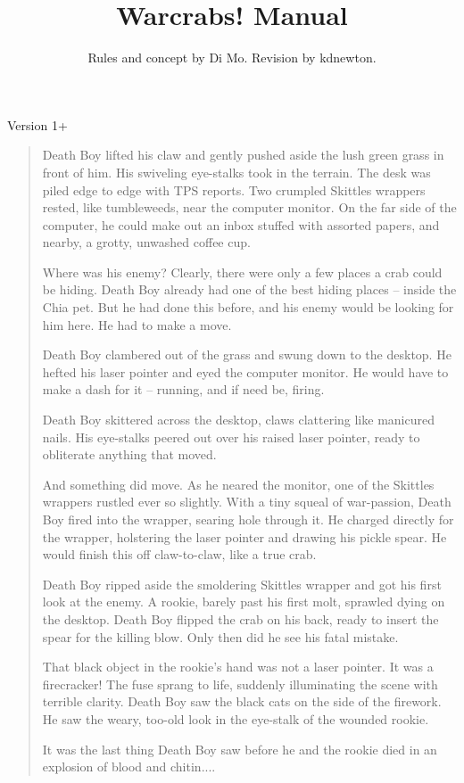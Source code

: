 \documentclass[a4paper,10pt]{article}
\title{Warcrabs! Manual}
\author{\small{Rules and concept by Di Mo. Revision by kdnewton.}}
\begin{document}
\date{}
\maketitle{}

\begin{center}
 \small{Version 1+}
\end{center}

\begin{quote}
Death Boy lifted his claw and gently pushed aside the lush green grass in front of him. His swiveling eye-stalks took in the terrain. The desk was piled edge to edge with TPS reports. Two crumpled Skittles wrappers rested, like tumbleweeds, near the computer monitor. On the far side of the computer, he could make out an inbox stuffed with assorted papers, and nearby, a grotty, unwashed coffee cup.

Where was his enemy? Clearly, there were only a few places a crab could be hiding. Death Boy already had one of the best hiding places -- inside the Chia pet. But he had done this before, and his enemy would be looking for him here. He had to make a move.

Death Boy clambered out of the grass and swung down to the desktop. He hefted his laser pointer and eyed the computer monitor. He would have to make a dash for it -- running, and if need be, firing.

Death Boy skittered across the desktop, claws clattering like manicured nails. His eye-stalks peered out over his raised laser pointer, ready to obliterate anything that moved.

And something did move. As he neared the monitor, one of the Skittles wrappers rustled ever so slightly. With a tiny squeal of war-passion, Death Boy fired into the wrapper, searing hole through it. He charged directly for the wrapper, holstering the laser pointer and drawing his pickle spear. He would finish this off claw-to-claw, like a true crab.

Death Boy ripped aside the smoldering Skittles wrapper and got his first look at the enemy. A rookie, barely past his first molt, sprawled dying on the desktop. Death Boy flipped the crab on his back, ready to insert the spear for the killing blow. Only then did he see his fatal mistake.

That black object in the rookie's hand was not a laser pointer. It was a firecracker! The fuse sprang to life, suddenly illuminating the scene with terrible clarity. Death Boy saw the black cats on the side of the firework. He saw the weary, too-old look in the eye-stalk of the wounded rookie.

It was the last thing Death Boy saw before he and the rookie died in an explosion of blood and chitin....
\end{quote}
\end{document}
